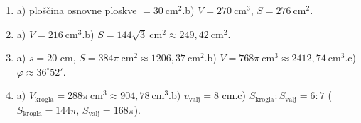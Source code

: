 \documentclass[a4paper,12pt]{letter}
\begin{document}
\begin{enumerate}
\item a) plo\v{s}\v{c}ina osnovne ploskve $=30\ \text{cm}^2$.\quad b) $V=270\ \text{cm}^3$, $S=276\ \text{cm}^2$.
\item a) $V=216\ \text{cm}^3$.\quad b) $S=144\sqrt3\ \text{cm}^2\approx249{,}42\ \text{cm}^2$.
\item a) $s=20$ cm, $S=384\pi\ \text{cm}^2\approx1206{,}37\ \text{cm}^2$.\quad b) $V=768\pi\ \text{cm}^3\approx2412{,}74\ \text{cm}^3$.\quad c) $\varphi\approx36^{\circ}52'$.
\item a) $V_{\text{krogla}}=288\pi\ \text{cm}^3\approx904{,}78\ \text{cm}^3$.\quad b) $v_{\text{valj}}=8$ cm.\quad c) $S_{\text{krogla}}:S_{\text{valj}}=6:7$ ($S_{\text{krogla}}=144\pi$, $S_{\text{valj}}=168\pi$).
\end{enumerate}
\end{document}

